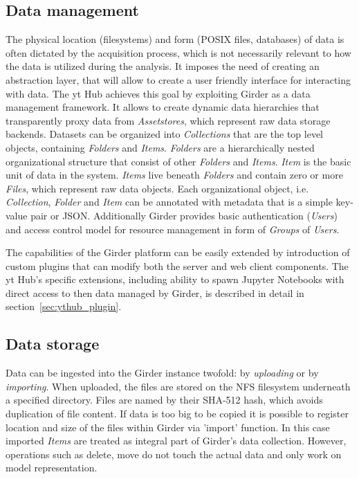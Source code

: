 \documentclass[conference]{IEEEtran}
\begin{document}
\subsection{Data management}
The physical location (filesystems) and form (POSIX files, databases) of data is
often dictated by the acquisition process, which is not necessarily relevant to
how the data is utilized during the analysis. It imposes the need of creating an
abstraction layer, that will allow to create a user friendly interface for
interacting with data. The yt Hub achieves this goal by exploiting Girder as a
data management framework. It allows to create dynamic data hierarchies that
transparently proxy data from \emph{Assetstores}, which represent raw data
storage backends. Datasets can be organized into \emph{Collections} that are the
top level objects, containing \emph{Folders} and \emph{Items}. \emph{Folders}
are a hierarchically nested organizational structure that consist of other
\emph{Folders} and \emph{Items}. \emph{Item} is the basic unit of data in the
system. \emph{Items} live beneath \emph{Folders} and contain zero or more
\emph{Files}, which represent raw data objects. Each organizational object, i.e.
\emph{Collection}, \emph{Folder} and \emph{Item} can be annotated with metadata
that is a simple key-value pair or JSON. Additionally Girder provides
basic authentication (\emph{Users}) and access control model for resource
management in form of \emph{Groups} of \emph{Users}.  
\par The capabilities of the Girder platform can be easily extended by
introduction of custom plugins that can modify both the server and web client
components. The yt Hub's specific extensions, including ability to spawn Jupyter
Notebooks with direct access to then data managed by Girder, is described in
detail in section~\ref{sec:ythub_plugin}.

\subsection{Data storage}
Data can be ingested into the Girder instance twofold: by \emph{uploading} or by
\emph{importing}. When uploaded, the files are stored on the NFS filesystem
underneath a specified directory. Files are named by their SHA-512 hash, which avoids
duplication of file content. If data is too big to be copied it is possible to
register location and size of the files within Girder via 'import' function. In
this case imported \emph{Items} are treated as integral part of Girder's data
collection. However, operations such as delete, move do not touch the actual
data and only work on model representation.
\end{document}
